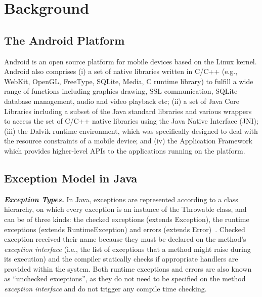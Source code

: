 \section{Background}
\label{sec:back}

\subsection{The Android Platform}
Android is an open source platform for mobile devices based on the Linux kernel.
Android also comprises (i) a set of native libraries written in C/C++ 
(e.g., WebKit, OpenGL, FreeType, SQLite, Media, C runtime library) to
fulfill a wide range of functions including graphics drawing, SSL communication, 
SQLite database management, audio and video playback etc; (ii) a set of Java Core Libraries 
including a subset of the Java standard libraries and various wrappers to access the set of C/C++ 
native libraries using the Java Native Interface (JNI); (iii) the Dalvik runtime environment, which was specifically designed to deal with the resource constraints of a mobile device; 
 and (iv) the Application Framework which provides higher-level APIs to the applications
 running on the platform.


\subsection{Exception Model in Java} \label{sec:extypes}

\emph{\textbf{Exception Types.}} In Java, exceptions are represented according to a class hierarchy, on which
 every exception is an instance of the Throwable class, and can be of three kinds: the checked exceptions
(extends Exception), the runtime exceptions (extends RuntimeException) and errors
(extends Error)~\cite{gosling2000java}. Checked exception received their name
 because they must be declared on the method's \emph{exception interface} (i.e., the list of exceptions that a method 
might raise during its execution) and the compiler statically checks if
 appropriate handlers are provided within the system.
Both runtime exceptions and errors are also known as ``unchecked exceptions'', as 
they do not need to be specified on the method \emph{exception interface} and do not trigger any 
compile time checking.

